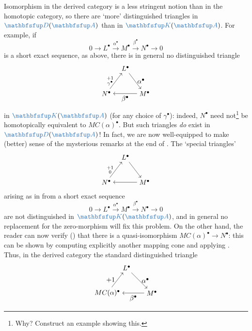 Isomorphism in the derived category is a less stringent notion than in
the homotopic category, so there are `more' distinguished triangles in
$\categ{D}(\categ{A})$ than in $\categ{K}(\categ{A})$.  For example,
if
\[
  0 \longrightarrow L^\bullet \xrightarrow{\alpha^\bullet} M^\bullet
  \xrightarrow{\beta^\bullet} N^\bullet \longrightarrow 0
\]
is a short exact sequence, as above, there is in general no
distinguished triangle
\[
  \begin{tikzpicture}[baseline=(current bounding box.center)]
    \node (L) at (1,1.3)
    {$L^\bullet$}; \node (N) at (0,0)
    {$N^\bullet$}; \node (M) at (2,0)
    {$M^\bullet$}; \draw[->] (L) -- (M) node[midway, right]
    {$\alpha^\bullet$}; \draw[->] (M) -- (N) node[midway, below]
    {$\beta^\bullet$}; \draw[->] (N) -- (L) node[midway, left]
    {$\substack{+1\\\gamma^\bullet}$};
  \end{tikzpicture}
\]
in $\categ{K}(\categ{A})$ (for any choice of $\gamma^\bullet$):
indeed, $N^\bullet$ need not\footnote{Why? Construct an example
  showing this.} be homotopically equivalent to $MC(\alpha)^\bullet$.
But such triangles \emph{do} exist in $\categ{D}(\categ{A})$!  In
fact, we are now well-equipped to make (better) sense of the
mysterious remarks at the end of . The
`special triangles'
\[
  \begin{tikzpicture}[baseline=(current bounding box.center)]
    \node (L) at (1,1.3)
    {$L^\bullet$}; \node (N) at (0,0)
    {$N^\bullet$}; \node (M) at (2,0)
    {$M^\bullet$}; \draw[->] (L) -- (M); \draw[->] (M) -- (N);
    \draw[->] (N) -- (L) node[midway, left] {$\substack{+1\\0}$};
  \end{tikzpicture}
\]
arising as in  from a short exact
sequence
\[
  0 \longrightarrow L^\bullet \xrightarrow{\alpha^\bullet} M^\bullet
  \xrightarrow{\beta^\bullet} N^\bullet \longrightarrow 0
\]
are not distinguished in $\categ{K}(\categ{A})$, and in general no
replacement for the zero-morphism will fix this problem. On the other
hand, the reader can now verify
()
that there is a quasi-isomorphism $MC(\alpha)^\bullet \to N^\bullet$:
this can be shown by computing explicitly another mapping cone and
applying . Thus, in the derived category the
standard distinguished triangle
\[
  \begin{tikzpicture}[baseline=(current bounding box.center)]
    \node (L) at (1,1.3)
    {$L^\bullet$}; \node (MC) at (0,0)
    {$MC(\alpha)^\bullet$}; \node (M) at (2.3,0)
    {$M^\bullet$}; \draw[->] (L) -- (M) node[midway, right]
    {$\alpha^\bullet$}; \draw[->] (M) -- (MC) node[midway, below]
    {$\beta^\bullet$}; \draw[->] (MC) -- (L) node[midway, left]
    {$+1$};
  \end{tikzpicture}
\]
